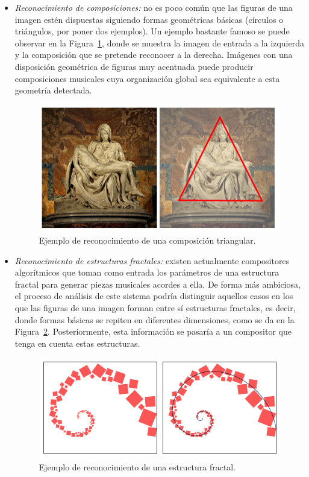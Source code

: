 \begin{itemize}
\begin{itemize}
		\item\textit{Reconocimiento de composiciones:} no es poco común que las figuras de una imagen estén dispuestas siguiendo formas geométricas básicas (círculos o triángulos, por poner dos ejemplos). Un ejemplo bastante famoso se puede observar en la Figura~\ref{fig:composition}, donde se muestra la imagen de entrada a la izquierda y la composición que se pretende reconocer a la derecha. Imágenes con una disposición geométrica de figuras muy acentuada puede producir composiciones musicales cuya organización global sea equivalente a esta geometría detectada.\\
			
			\begin{figure}[!htbp]
			\centering
			\includegraphics[scale=0.40]{graphics/composition2.png}
			\caption{Ejemplo de reconocimiento de una composición triangular.}
			\label{fig:composition}
			\end{figure}
		
		\item\textit{Reconocimiento de estructuras fractales:}
existen actualmente compositores algorítmicos que toman como entrada los parámetros de una estructura fractal para generar piezas musicales acordes a ella. De forma más ambiciosa, el proceso de análisis de este sistema podría distinguir aquellos casos en los que las figuras de una imagen forman entre sí estructuras fractales, es decir, donde formas básicas se repiten en diferentes dimensiones, como se da en la Figura~\ref{fig:fractal}. Posteriormente, esta información se pasaría a un compositor que tenga en cuenta estas estructuras.
		
			\begin{figure}[!htbp]
			\centering
			\includegraphics[scale=0.47]{graphics/fractal.png}
			\caption{Ejemplo de reconocimiento de una estructura fractal.}
			\label{fig:fractal}
			\end{figure}


\end{itemize}
\end{itemize}

